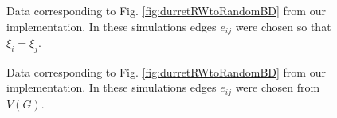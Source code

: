 \documentclass[11pt]{article}
\begin{document}
\begin{figure}[h!]
  \centering
  \hspace{3mm}
  \caption{Data corresponding to Fig. \ref{fig:durretRWtoRandomBD} from our implementation. In these simulations edges $e_{ij}$ were chosen so that $\xi_{i}=\xi_{j}$.}
  \label{fig:myRWtoRandomBD}
\end{figure}

\begin{figure}[h!]
  \centering
  \hspace{3mm}
  \caption{Data corresponding to Fig. \ref{fig:durretRWtoRandomBD} from our implementation. In these simulations edges $e_{ij}$ were chosen from $V(G)$.}
  \label{fig:myRWtoRandomBD}
\end{figure}
\end{document}
